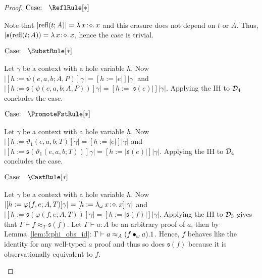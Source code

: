 \begin{proof}
    $\text{Case: }\begin{array}{c} \ReflRule[*] \end{array}$
    \begin{proofcase}
        Note that $|\textnormal{refl}(t; A)| = {\lambda}\, x\! : \! \diamond.\, x$ and this erasure does not depend on $t$ or $A$.
        Thus, $|\mathfrak{s}(\textnormal{refl}(t; A)) = {\lambda}\, x\! : \! \diamond.\, x$, hence the case is trivial.
    \end{proofcase}

    $\text{Case: }\begin{array}{c} \SubstRule[*] \end{array}$
    \begin{proofcase}
        Let $\gamma$ be a context with a hole variable $h$.
        Now $|[h := \psi(e, a, b; A, P)]\gamma| = [h := |e|]|\gamma|$ and $|[h := \mathfrak{s}(\psi(e, a, b; A, P))]\gamma| = [h := |\mathfrak{s}(e)|]|\gamma|$.
        Applying the IH to $\mathcal{D}_{4}$ concludes the case.
    \end{proofcase}

    $\text{Case: }\begin{array}{c} \PromoteFstRule[*] \end{array}$
    \begin{proofcase}
        Let $\gamma$ be a context with a hole variable $h$.
        Now $|[h := \vartheta_1(e, a, b; T)]\gamma| = [h := |e|]|\gamma|$ and $|[h := \mathfrak{s}(\vartheta_1(e, a, b; T))]\gamma| = [h := |\mathfrak{s}(e)|]|\gamma|$.
        Applying the IH to $\mathcal{D}_{4}$ concludes the case.
    \end{proofcase}

    $\text{Case: }\begin{array}{c} \CastRule[*] \end{array}$
    \begin{proofcase}
        Let $\gamma$ be a context with a hole variable $h$.
        Now $|[h := \varphi(f, e; A, T)]\gamma| = [h := {\lambda_\omega}\, x\! : \! \diamond.\, x]|\gamma|$ and $|[h := \mathfrak{s}(\varphi(f, e; A,T))]\gamma| = [h := |\mathfrak{s}(f)|]|\gamma|$.
        Applying the IH to $\mathcal{D}_{3}$ gives that $\Gamma \vdash f \approx_T \mathfrak{s}(f)$.
        Let $\Gamma \vdash a : A$ be an arbitrary proof of $a$, then by Lemma~\ref{lem:5:phi_obs_id}: $\Gamma \vdash a \approx_A (f \bullet_{\omega} a).1$.
        Hence, $f$ behaves like the identity for any well-typed $a$ proof and thus so does $\mathfrak{s}(f)$ because it is observationally equivalent to $f$.
    \end{proofcase}


\end{proof}
